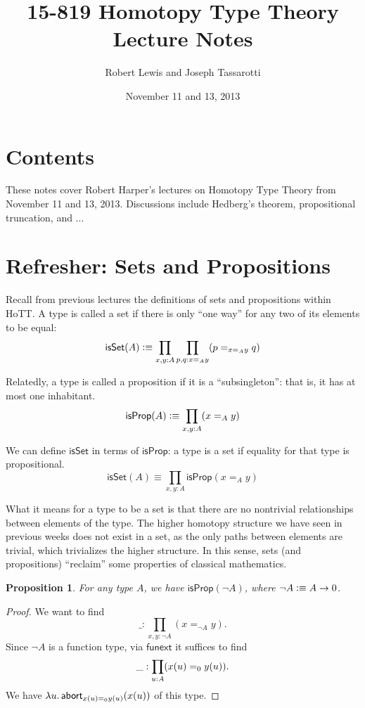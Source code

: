 \documentclass[11pt]{article}
\title{15-819 Homotopy Type Theory\\Lecture Notes}
\author{Robert Lewis and Joseph Tassarotti}
\date{November 11 and 13, 2013}
\newcommand*{\funext}{\mathsf{funext}}
\newcommand*{\isSet}{\mathsf{isSet}}
\newcommand*{\isProp}{\mathsf{isProp}}
\newtheorem{proposition}{Proposition}
\begin{document}
\maketitle

\section{Contents}
These notes cover Robert Harper's lectures on Homotopy Type Theory from
November 11 and 13, 2013. Discussions include Hedberg's theorem, propositional truncation,
and ...


\section{Refresher: Sets and Propositions}
Recall from previous lectures the definitions of sets and propositions within HoTT.
A type is called a set if there is only ``one way'' for any two of its elements to be equal:
$$ \isSet(A) \defeq \prod_{x,y:A}\prod_{p,q: x=_Ay}(p=_{x=_A y}q) $$

Relatedly, a type is called a proposition if it is a ``subsingleton'': that is, it has at most one inhabitant.
$$ \isProp(A) \defeq \prod_{x,y:A}(x=_A y) $$

We can define $\isSet$ in terms of $\isProp$: a type is a set if equality for that type is propositional.
$$ \isSet(A) \equiv \prod_{x,y:A}\isProp(x=_A y) $$

What it means for a type to be a set is that there are no nontrivial relationships between 
elements of the type. The higher homotopy structure we have seen in previous weeks does not exist
in a set, as the only paths between elements are trivial, which trivializes the higher structure.
In this sense, sets (and propositions) ``reclaim'' some properties of classical mathematics.

\begin{proposition}
 For any type $A$, we have $\isProp(\neg A)$, where $\neg A\vcentcolon\equiv A\to 0$.
\end{proposition}
\begin{proof}
 We want to find $$\_:\prod_{x,y:\neg A}(x=_{\neg A} y).$$ Since $\neg A$ is a function type, 
 via $\funext$ it suffices to find $$\_:\prod_{u: A}(x(u) =_0 y(u)).$$ 
 We have $\lambda u.\, \mathsf{abort}_{x(u)=_0 y(u)}(x(u))$ of this type.
\end{proof}
\end{document}
